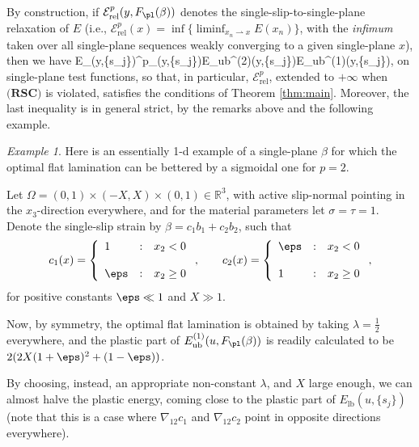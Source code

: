 \documentclass[11pt,reqno]{amsart}
\theoremstyle{plain}
\theoremstyle{definition}
\theoremstyle{remark}
\newtheorem{example}{Example}
\begin{document}
By construction, if $\mathcal{E}^p_{\mathrm{rel}}(y,F_\pl(\beta))$ denotes the single-slip-to-single-plane relaxation of $E$ (i.e., $\mathcal{E}^p_{\mathrm{rel}}(x) = \inf\{\liminf_{x_n\rightharpoonup x}E(x_n)\}$, with the {\em infimum} taken over all single-plane sequences weakly converging to a given single-plane $x$), then we have 
\be\label{energy_chain}
E_{}(y,\{s_j\})\leq {}^p_{}(y,\{s_j\})\leq E_{\textrm{ub}}^{(2)}(y,\{s_j\})\leq E_{\textrm{ub}}^{(1)}(y,\{s_j\}),
\ee
on single-plane test functions, so that, in particular, $\mathcal{E}^p_{\mathrm{rel}}$, extended to $+\infty$ when $\textbf{(RSC)}$ is violated, satisfies the conditions of Theorem \ref{thm:main}. Moreover, the  last inequality is in general strict, by the remarks above and the following example.

\begin{example}\label{ex:1}
Here is an essentially 1-d example of a single-plane $\beta$ for which the optimal flat lamination can be bettered by a sigmoidal one for $p=2$. 

Let $\Omega = (0,1)\times(-X,X)\times(0,1)\in\mathbb{R}^3$, with active slip-normal pointing in the $x_3$-direction everywhere, and for the material parameters let $\sigma=\tau=1$. Denote the single-slip strain by $\beta = c_1b_1 + c_2b_2$, such that
\[
c_1(x) =
 \left\{
\begin{array}{lcl}
 1 & : & x_2<0  \\
  & &    \\
 \eps & : & x_2\geq0 \\
\end{array}
\right.,\qquad
c_2(x) =
 \left\{
\begin{array}{lcl}
 \eps & : & x_2<0  \\
  & &    \\
 1 & : & x_2\geq0 \\
\end{array}
\right.,
\]
for positive constants $\eps\ll 1$ and $X\gg 1$.

Now, by symmetry, the optimal flat lamination is obtained by taking $\lambda=\frac{1}{2}$
 everywhere, and the plastic part of $E_{\textrm{ub}}^{(1)}(u,F_\pl(\beta))$ is readily calculated to be $2(2X(1+\eps)^2 + (1-\eps))$.
 
By choosing, instead, an appropriate non-constant $\lambda$, and $X$ large enough, we can almost halve the plastic energy, coming close to the plastic part of $E_{\textrm{lb}}(u,\{s_j\})$ (note that this is a case where $\nabla_{12}c_1$ and $\nabla_{12}c_2$ point in opposite directions everywhere). 


\end{example}
\end{document}
